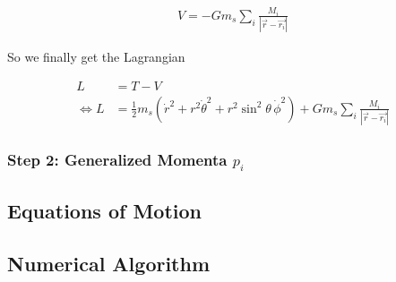 \begin{align}
    V = -G m_s \sum\limits_{i} \frac{M_i}{\left| \vec{r} - \vec{r_i} \right|}
\end{align}

So we finally get the Lagrangian

\begin{align}
    L &= T - V \\
    \Leftrightarrow L &= \frac{1}{2} m_s (\dot{r}^2 + r^2\dot{\theta}^2 + r^2\sin^2{\theta}\,\dot{\phi}^2) + G m_s \sum\limits_{i} \frac{M_i}{\left| \vec{r} - \vec{r_i} \right|}
\end{align}

\subsubsection{Step 2: Generalized Momenta \(p_i\)}


\subsection{Equations of Motion}


\subsection{Numerical Algorithm}
